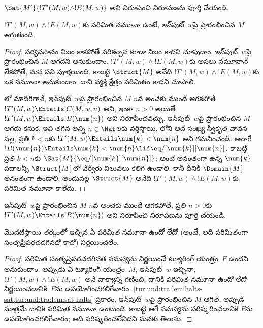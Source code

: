 \documentclass[../../../include/open-logic-section]{subfiles}
\begin{document}
\begin{prob}
  $\Sat{M'}{!T'(M,w)\land !E(M,w)}$ అని నిరూపించి
   నిరూపణను పూర్తి చేయండి.
\end{prob}

\begin{lem}
  $!T'(M,w)\land !E(M,w)$కు పరిమిత నమూనా ఉంటే, ఇన్‌పుట్~$w$పై
  ప్రారంభించిన $M$ ఆగుతుంది.
\end{lem}

\begin{proof}
  పర్యవసానం నిజం కాకపోతే పరికల్పన కూడా నిజం కాదని చూపుదాం.
  ఇన్‌పుట్~$w$పై ప్రారంభించిన $M$ ఆగదని అనుకుందాం.
  $!T'(M,w)\land !E(M,w)$కు అసలు నమూనానే లేకపోతే, మన పని పూర్తయింది.
  కాబట్టి $\Struct{M}$ అనేది $!T'(M,w)\land !E(M,w)$కు ఒక నమూనా
  అనుకుందాం. దాని వ్యక్తి క్షేత్రం పరిమితం కాదని చూపాలి.

  లో మాదిరిగానే, ఇన్‌పుట్~$w$పై ప్రారంభించిన $M$
  $n$వ అంచెకు ముందే ఆగకపోతే
  $!T'(M,w)\Entails !C(M,w,n)$ అని, ఇంకా $n>0$ అయితే
  $!T'(M,w)\Entails !B(\num{n})$ అని నిరూపించవచ్చు. ఇన్‌పుట్~$w$పై
  ప్రారంభించిన $M$ ఆగదు కనుక, ఇవి తగిన అన్ని $n\in\Nat$లకు వర్తిస్తాయి.
  లోని అదే సంఖ్య-స్వీకృత వాదన వల్ల, ప్రతి $k<n$కు
  $!T'(M,w)\Entails \num{k}<\num{n}$ అని గమనించండి. అలాగే
  $!B(\num{n})\Entails
  \num{k}<\num{n}\lif\eq/[\num{k}][\num{n}]$. కాబట్టి ప్రతి $k<n$కు
  $\Sat{M}{\eq/[\num{k}][\num{n}]}$; అంటే అనంతంగా ఉన్న
  $\num{k}$ పదాలన్నీ $\Struct{M}$లో వేర్వేరు విలువలు కలిగి ఉండాలి. కానీ
  దీనికి $\Domain{M}$ అనంతంగా ఉండాలి. అందువల్ల $\Struct{M}$ అనేది
  $!T'(M,w)\land !E(M,w)$కు పరిమిత నమూనా కాలేదు.
\end{proof}

\begin{prob}
  ఇన్‌పుట్~$w$పై ప్రారంభించిన $M$ $n$వ అంచెకు ముందే ఆగకపోతే, ప్రతి
  $n>0$కు $!T'(M,w)\Entails !B(\num{n})$ అని నిరూపించి
   నిరూపణను పూర్తి చేయండి.
\end{prob}

\begin{thm}[ట్రాఖ్టెన్‌బ్రోట్ సిద్ధాంతం]
  మొదటిస్థాయి తర్కంలో ఇచ్చిన ఏ  పరిమిత నమూనా ఉందో లేదో
  (అంటే, అది పరిమితంగా సంతృప్తిపరచదగినదో కాదో) నిర్ణయించలేం.
\end{thm}

\begin{proof}
  పరిమిత సంతృప్తిపరచదగినత సమస్యను నిర్ణయించే ట్యూరింగ్ యంత్రం~$F$ ఉందని
  అనుకుందాం. అప్పుడు ఏ ట్యూరింగ్ యంత్రం~$M$, ఇన్‌పుట్~$w$ ఇచ్చినా,
  $!T'(M,w)\land !E(M,w)$ అనే వాక్యాన్ని గణించి, దానికి పరిమిత నమూనా
  ఉందో లేదో నిర్ణయించడానికి~$F$ను ఉపయోగించగలిగేవారం.
  \cref{tur:und:tra:lem:halts-sat,tur:und:tra:lem:sat-halts} ప్రకారం,
  ఇన్‌పుట్~$w$పై ప్రారంభించిన $M$ ఆగితే, అప్పుడే మాత్రమే దానికి పరిమిత
  నమూనా ఉంటుంది. కాబట్టి ఆగే సమస్యను పరిష్కరించడానికి $F$ను ఉపయోగించగలిగేవారం;
  అది పరిష్కరించలేనిదని మనకు తెలుసు.
\end{proof}
\end{document}

